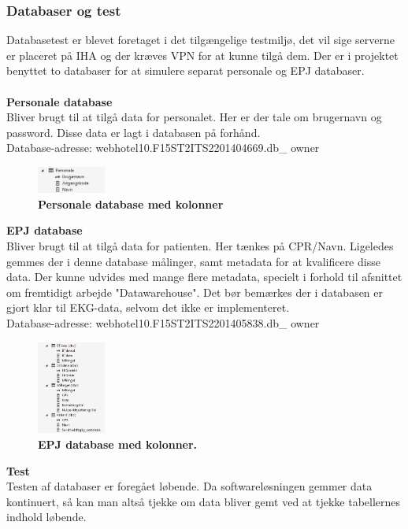 \subsubsection{Databaser og test}
Databasetest er blevet foretaget i det tilgængelige testmiljø, det vil sige serverne er placeret på IHA og der kræves VPN for at kunne tilgå dem. Der er i projektet benyttet to databaser for at simulere separat personale og EPJ databaser. \\\\
\textbf{Personale database}\\
Bliver brugt til at tilgå data for personalet. Her er der tale om brugernavn og password. Disse data er lagt i databasen på forhånd.\\
Database-adresse: webhotel10.F15ST2ITS2201404669.db\_ owner
\begin{figure}[H]
\includegraphics[width =0.2\textwidth , center]{billeder/database_p_tabel}
\caption{\textbf{Personale database med kolonner}}
\end{figure}
\textbf{EPJ database}\\
Bliver brugt til at tilgå data for patienten. Her tænkes på CPR/Navn. Ligeledes gemmes der i denne database målinger, samt metadata for at kvalificere disse data. Der kunne udvides med mange flere metadata, specielt i forhold til afsnittet om fremtidigt arbejde "Datawarehouse". Det bør bemærkes der i databasen er gjort klar til EKG-data, selvom det ikke er implementeret.\\
Database-adresse: webhotel10.F15ST2ITS2201405838.db\_ owner
\begin{figure}[H]
\includegraphics[width =0.2\textwidth , center]{billeder/database_e_tabel}
\caption{\textbf{EPJ database med kolonner.}}
\end{figure}
\textbf{Test}\\
Testen af databaser er foregået løbende. Da softwareløsningen gemmer data kontinuert, så kan man altså tjekke om data bliver gemt ved at tjekke tabellernes indhold løbende. 

